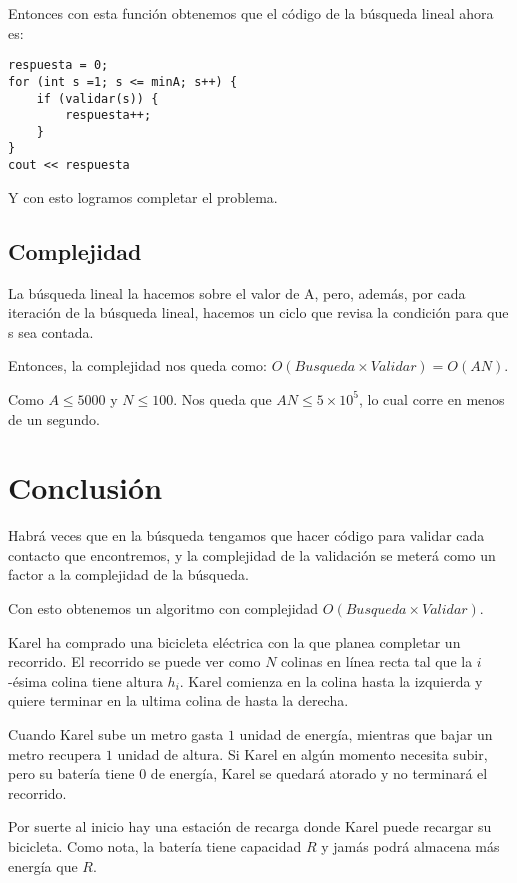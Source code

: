 Entonces con esta función obtenemos que el código de la búsqueda lineal ahora es:
\begin{lstlisting}
respuesta = 0;
for (int s =1; s <= minA; s++) {
	if (validar(s)) {
		respuesta++;
	}
}
cout << respuesta

\end{lstlisting}

Y con esto logramos completar el problema.

\subsection*{Complejidad}
La búsqueda lineal la hacemos sobre el valor de A, pero, además, por cada iteración de la búsqueda lineal, hacemos un ciclo que revisa la condición para que s sea contada.

Entonces, la complejidad nos queda como:   \(O(Busqueda\times Validar)=O(AN)\).

Como \(A\leq 5000\) y \(N\leq 100\). Nos queda que \(AN\leq 5\times 10^5\), lo cual corre en menos de un segundo.

\section*{Conclusión}
Habrá veces que en la búsqueda tengamos que hacer código para validar cada contacto que encontremos, y la complejidad de la validación se meterá como un factor a la complejidad de la búsqueda.  

Con esto obtenemos un algoritmo con complejidad \(O(Busqueda\times Validar)\).
\newpage

\label{bicicleta}
\problemtitle  Karel ha comprado una bicicleta eléctrica con la que planea completar un recorrido. El recorrido se puede ver como \(N\) colinas en línea recta tal que la \(i\)-ésima colina tiene altura \(h_i\). Karel comienza en la colina hasta la izquierda y quiere terminar en la ultima colina de hasta la derecha.

Cuando Karel sube un metro gasta \(1\) unidad de energía, mientras que bajar un metro recupera \(1\) unidad de altura. Si Karel en algún momento necesita subir, pero su batería tiene 0 de energía, Karel se quedará atorado y no terminará el recorrido.

Por suerte al inicio hay una estación de recarga donde Karel puede recargar su bicicleta. Como nota, la batería tiene capacidad \(R\) y jamás podrá almacena más energía que \(R\).

